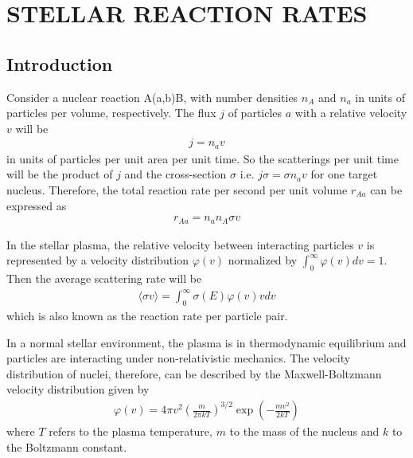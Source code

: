 
%
%


\chapter{STELLAR REACTION RATES}

\section{Introduction}
Consider a nuclear reaction A(a,b)B, with number densities $n_A$ and $n_a$ in units of particles per volume, respectively. The flux $j$ of particles $a$ with a relative velocity $v$ will be
 \begin{equation}
    \label{j_a}
    \begin{aligned}
        j = n_a v
    \end{aligned}
\end{equation}
in units of particles per unit area per unit time. So the scatterings per unit time will be the product of $j$ and the cross-section $\sigma$ i.e. $j \sigma=\sigma n_a v$ for one target nucleus. Therefore, the total reaction rate per second per unit volume $r_{Aa}$ can be expressed as
 \begin{equation}
    \label{r12}
    \begin{aligned}
    r_{Aa}=n_a n_A \sigma v
    \end{aligned}
\end{equation}

In the stellar plasma, the relative velocity between interacting particles $v$ is represented by a velocity distribution $\varphi(v)$  normalized by $\int_{0}^{\infty}\varphi(v)dv=1$. Then the average scattering rate will be
 \begin{equation}
    \label{sigmav_0}
    \begin{aligned}
    \langle \sigma v\rangle = \int_{0}^{\infty}\sigma(E) \varphi(v) v dv
    \end{aligned}
\end{equation}
which is also known as the reaction rate per particle pair.


In a normal stellar environment, the plasma is in thermodynamic equilibrium and particles are interacting under non-relativistic mechanics. The velocity distribution of nuclei, therefore, can be described by the Maxwell-Boltzmann velocity distribution given by
\begin{equation}
    \label{MB}
    \begin{aligned}
        \varphi(v)= 4 \pi v^2 (\frac{m}{2\pi kT})^{3/2} \exp(-\frac{mv^2}{2kT})
    \end{aligned}
\end{equation}
where $T$ refers to the plasma temperature, $m$ to the mass of the nucleus and $k$ to the Boltzmann constant.


